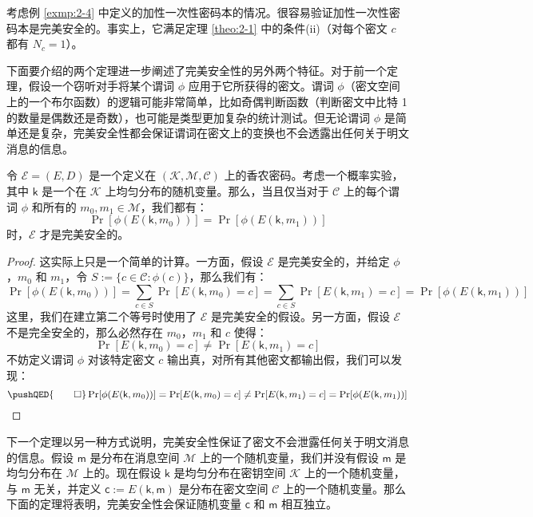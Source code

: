\begin{example}
考虑例 \ref{exmp:2-4} 中定义的加性一次性密码本的情况。很容易验证加性一次性密码本是完美安全的。事实上，它满足定理 \ref{theo:2-1} 中的条件(ii)（对每个密文 $c$ 都有 $N_c=1$）。
\end{example}


下面要介绍的两个定理进一步阐述了完美安全性的另外两个特征。对于前一个定理，假设一个窃听对手将某个谓词 $\phi$ 应用于它所获得的密文。谓词 $\phi$（密文空间上的一个布尔函数）的逻辑可能非常简单，比如奇偶判断函数（判断密文中比特 1 的数量是偶数还是奇数），也可能是类型更加复杂的统计测试。但无论谓词 $\phi$ 是简单还是复杂，完美安全性都会保证谓词在密文上的变换也不会透露出任何关于明文消息的信息。

\begin{theorem}\label{theo:2-3}
令 $\mathcal{E}=(E,D)$ 是一个定义在 $(\mathcal{K},\mathcal{M},\mathcal{C})$ 上的香农密码。考虑一个概率实验，其中 $\mathsf{k}$ 是一个在 $\mathcal{K}$ 上均匀分布的随机变量。那么，当且仅当对于 $\mathcal{C}$ 上的每个谓词 $\phi$ 和所有的 $m_0,m_1\in\mathcal{M}$，我们都有：
\[
\Pr[\phi(E(\mathsf{k},m_0))]=
\Pr[\phi(E(\mathsf{k}, m_1))]
\]
时，$\mathcal{E}$ 才是完美安全的。
\end{theorem}

\begin{proof}
这实际上只是一个简单的计算。一方面，假设 $\mathcal{E}$ 是完美安全的，并给定 $\phi$，$m_0$ 和 $m_1$，令 $S:=\{c\in\mathcal{C}:\phi(c)\}$，那么我们有：
\[
\Pr[\phi(E(\mathsf{k}, m_0))]=\sum_{c\in S}\Pr[E(\mathsf{k}, m_0) = c]=\sum_{c\in S}\Pr[E(\mathsf{k}, m_1) = c]=\Pr[\phi(E(\mathsf{k}, m_1) )]
\]
这里，我们在建立第二个等号时使用了 $\mathcal{E}$ 是完美安全的假设。另一方面，假设 $\mathcal{E}$ 不是完全安全的，那么必然存在 $m_0$，$m_1$ 和 $c$ 使得：
\[
\Pr[E(\mathsf{k},m_0)=c]\neq
\Pr[E(\mathsf{k},m_1)=c]
\]
不妨定义谓词 $\phi$ 对该特定密文 $c$ 输出真，对所有其他密文都输出假，我们可以发现：
\[
\pushQED{\qed}
\Pr[\phi(E(\mathsf{k}, m_0))]= 
\Pr[E(\mathsf{k}, m_0) = c]\neq
\Pr[E(\mathsf{k}, m_1) = c]=
\Pr[\phi(E(\mathsf{k}, m_1))]\qedhere
\]
\end{proof}

下一个定理以另一种方式说明，完美安全性保证了密文不会泄露任何关于明文消息的信息。假设 $\mathsf{m}$ 是分布在消息空间 $\mathcal{M}$ 上的一个随机变量，我们并没有假设 $\mathsf{m}$ 是均匀分布在 $\mathcal{M}$ 上的。现在假设 $\mathsf{k}$ 是均匀分布在密钥空间 $\mathcal{K}$ 上的一个随机变量，与 $\mathsf{m}$ 无关，并定义 $\mathsf{c}:=E(\mathsf{k},\mathsf{m})$ 是分布在密文空间 $\mathcal{C}$ 上的一个随机变量。那么下面的定理将表明，完美安全性会保证随机变量 $\mathsf{c}$ 和 $\mathsf{m}$ 相互独立。

